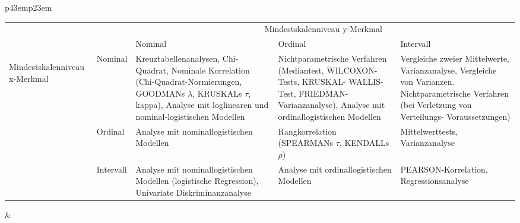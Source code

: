 \documentclass[fleqn, oneside, 10pt, titlepage]{article}
\begin{document}
\newpage
\begin{tabularx}{\textwidth}{p{43em}p{23em}}
\begin{tabular}{p{1em} p{5em}|p{10em}|p{10em}|p{10em}|}
\cline{3-5}  & & \multicolumn{3}{|c|}{Mindestskalenniveau y-Merkmal} \\ 
\cline{3-5}  & & Nominal & Ordinal & Intervall \\ 
\cline{1-5} \multirow{4}{4mm}{\begin{sideways}Mindestskalenniveau x-Merkmal $\, \, \,$\end{sideways}} & Nominal & Kreuztabellenanalysen, Chi-
Quadrat, Nominale Korrelation
(Chi-Quadrat-Normierungen,
GOODMANs $\lambda$, KRUSKALs $\tau$,
kappa), Analyse mit loglinearen
und nominal-logistischen Modellen & Nichtparametrische Verfahren
(Mediantest,
WILCOXON-Tests, KRUSKAL-
WALLIS-Test, FRIEDMAN-
Varianzanalyse),
Analyse mit ordinallogistischen
Modellen & Vergleiche zweier Mittelwerte,
Varianzanalyse,
Vergleiche von Varianzen.
Nichtparametrische
Verfahren (bei Verletzung
von Verteilungs-
Voraussetzungen) \\ 
\cline{2-5}  & Ordinal & Analyse mit nominallogistischen
Modellen & Rangkorrelation
(SPEARMANs $\tau$, KENDALLs
$\rho$) & Mittelwerttests, Varianzanalyse \\ 
\cline{2-5}  & Intervall & Analyse mit nominallogistischen
Modellen (logistische
Regression), Univariate
Diskriminanzanalyse & Analyse mit ordinallogistischen
Modellen & PEARSON-Korrelation,
Regressionsanalyse \\ 
\cline{1-5} 
\end{tabular} 
&


\end{tabularx} 
\end{document}
